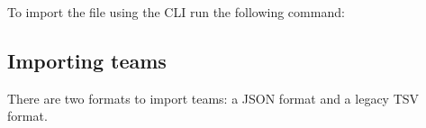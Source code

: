 \documentclass[a4paper,10pt,english,openany]{sphinxmanual}
\begin{document}
\begin{sphinxVerbatim}[commandchars=\\\{\}]
      
\end{sphinxVerbatim}

\sphinxAtStartPar
To import the file using the CLI run the following command:

\begin{sphinxVerbatim}[commandchars=\\\{\}]
      
\end{sphinxVerbatim}


\subsection{Importing teams}
\label{\detokenize{import:importing-teams}}
\sphinxAtStartPar
There are two formats to import teams: a JSON format and a legacy TSV format.
\end{document}
